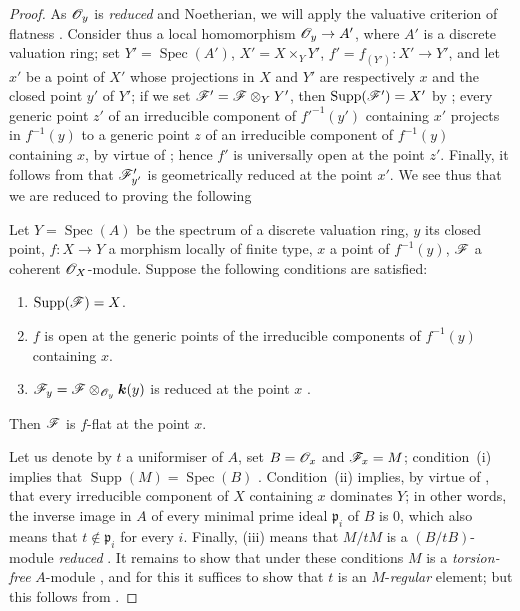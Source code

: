 \begin{proof}
\label{IV.15.2.2-proof}
As $\mathscr{O}_y$ is \emph{reduced} and Noetherian, we will apply the valuative criterion of flatness .
Consider thus a local homomorphism $\mathscr{O}_y\to A'$, where $A'$ is a discrete valuation ring; set $Y'=\operatorname{Spec}(A')$, $X'=X\times_YY'$, $f'=f_{(Y')}:X'\to Y'$, and let $x'$ be a point of $X'$ whose projections in $X$ and $Y'$ are respectively $x$ and the closed point $y'$ of $Y'$; if we set $\mathscr{F}'=\mathscr{F}\otimes_YY'$, then $\operatorname{Supp}(\mathscr{F}')=X'$ by ; every generic point $z'$ of an irreducible component of $f'^{-1}(y')$ containing $x'$ projects in $f^{-1}(y)$ to a generic point $z$ of an irreducible component of $f^{-1}(y)$ containing $x$, by virtue of ; hence $f'$ is universally open at the point $z'$.
Finally, it follows from  that $\mathscr{F}_{y'}'$ is geometrically reduced at the point $x'$.
We see thus that we are reduced to proving the following

\begin{lemma}[15.2.2.1]
\label{IV.15.2.2.1}
Let $Y=\operatorname{Spec}(A)$ be the spectrum of a discrete valuation ring, $y$ its closed point, $f:X\to Y$ a morphism locally of finite type, $x$ a point of $f^{-1}(y)$, $\mathscr{F}$ a coherent $\mathscr{O}_X$-module.
Suppose the following conditions are satisfied:
\begin{enumerate}[label=\textup{(\roman*)}]
  \item $\operatorname{Supp}(\mathscr{F})=X$.
  \item $f$ is open at the generic points of the irreducible components of $f^{-1}(y)$ containing $x$.
  \item $\mathscr{F}_y=\mathscr{F}\otimes_{\mathscr{O}_y}\boldsymbol{k}(y)$ is reduced at the point $x$ .
\end{enumerate}
Then $\mathscr{F}$ is $f$-flat at the point $x$.
\end{lemma}

Let us denote by $t$ a uniformiser of $A$, set $B=\mathscr{O}_x$ and $\mathscr{F}_x=M$; condition~(i) implies that $\operatorname{Supp}(M)=\operatorname{Spec}(B)$ .
Condition~(ii) implies, by virtue of , that every irreducible component of $X$ containing $x$ dominates $Y$; in other words, the inverse image in $A$ of every minimal prime ideal $\mathfrak{p}_i$ of $B$ is $0$, which also means that $t\notin\mathfrak{p}_i$ for every $i$. Finally, (iii) means that $M/tM$ is a $(B/tB)$-module \emph{reduced} .
It remains to show that under these conditions $M$ is a \emph{torsion-free} $A$-module , and for this it suffices to show that $t$ is an $M$-\emph{regular} element; but this follows from .
\end{proof}

